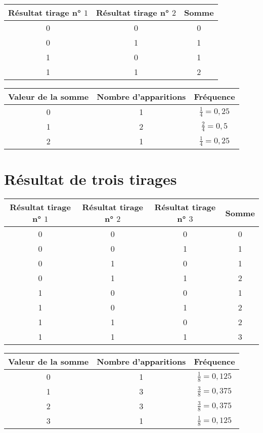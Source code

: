 \documentclass{article}
\begin{document}
\begin{center}
\begin{tabular}{|c|c|c|}
\hline
Résultat tirage n° \( 1 \) & Résultat tirage n° \( 2 \) & Somme \\ \hline
0 & 0 & 0 \\ \hline
0 & 1 & 1 \\ \hline
1 & 0 & 1 \\ \hline
1 & 1 & 2 \\ \hline
\end{tabular}

\vspace{0.3cm}

\begin{tabular}{|c|c|c|}
\hline
Valeur de la somme & Nombre d'apparitions & Fréquence \\ \hline
0 & 1 & $\frac{1}{4} = 0,25$ \\ \hline
1 & 2 & $\frac{2}{4} = 0,5$ \\ \hline
2 & 1 & $\frac{1}{4} = 0,25$ \\ \hline
\end{tabular}
\end{center}

\section*{Résultat de trois tirages}

\begin{center}
\begin{tabular}{|c|c|c|c|}
\hline
Résultat tirage n° \( 1 \) & Résultat tirage n° \( 2 \) & Résultat tirage n° \( 3 \) & Somme \\ \hline
0 & 0 & 0 & 0 \\ \hline
0 & 0 & 1 & 1 \\ \hline
0 & 1 & 0 & 1 \\ \hline
0 & 1 & 1 & 2 \\ \hline
1 & 0 & 0 & 1 \\ \hline
1 & 0 & 1 & 2 \\ \hline
1 & 1 & 0 & 2 \\ \hline
1 & 1 & 1 & 3 \\ \hline
\end{tabular}

\vspace{3 cm}


\begin{tabular}{|c|c|c|}
\hline
Valeur de la somme & Nombre d'apparitions & Fréquence \\ \hline
0 & 1 & $\frac{1}{8} = 0,125$ \\ \hline
1 & 3 & $\frac{3}{8} = 0,375$ \\ \hline
2 & 3 & $\frac{3}{8} = 0,375$ \\ \hline
3 & 1 & $\frac{1}{8} = 0,125$ \\ \hline
\end{tabular}
\end{center}
\end{document}
